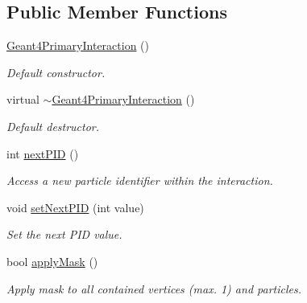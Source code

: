 \subsection*{Public Member Functions}
\begin{DoxyCompactItemize}
\item 
\hyperlink{class_d_d4hep_1_1_simulation_1_1_geant4_primary_interaction_adc7aaf8a360e02d21799182baee96792}{Geant4PrimaryInteraction} ()
\begin{DoxyCompactList}\small\item\em Default constructor. \item\end{DoxyCompactList}\item 
virtual \hyperlink{class_d_d4hep_1_1_simulation_1_1_geant4_primary_interaction_a8e8464271e737da64d13db8d0c926436}{$\sim$Geant4PrimaryInteraction} ()
\begin{DoxyCompactList}\small\item\em Default destructor. \item\end{DoxyCompactList}\item 
int \hyperlink{class_d_d4hep_1_1_simulation_1_1_geant4_primary_interaction_a2edc81343a8d45ba50ea4ae95cb636c2}{nextPID} ()
\begin{DoxyCompactList}\small\item\em Access a new particle identifier within the interaction. \item\end{DoxyCompactList}\item 
void \hyperlink{class_d_d4hep_1_1_simulation_1_1_geant4_primary_interaction_a18973191ce0e16877f95654c4ee56a30}{setNextPID} (int value)
\begin{DoxyCompactList}\small\item\em Set the next PID value. \item\end{DoxyCompactList}\item 
bool \hyperlink{class_d_d4hep_1_1_simulation_1_1_geant4_primary_interaction_adcf2faaa67296efa47035fb2c00719a6}{applyMask} ()
\begin{DoxyCompactList}\small\item\em Apply mask to all contained vertices (max. 1) and particles. \item\end{DoxyCompactList}\end{DoxyCompactItemize}
